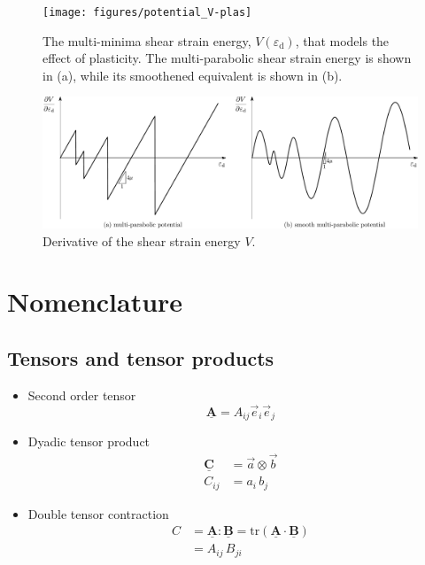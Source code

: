 \documentclass[times,namecite]{goose-article}
\newcommand\T[1]{\underline{\bm{{#1}}}}
\begin{document}
\begin{figure}[htp]
  \centering
  \texttt{[image: figures/potential\_V-plas]}
  \caption{The multi-minima shear strain energy, $V ( \varepsilon_\mathrm{d} )$, that models the effect of plasticity. The multi-parabolic shear strain energy is shown in (a), while its smoothened equivalent is shown in (b).}
  \label{fig:V:plas}
\end{figure}

\begin{figure}[htp]
  \centering
  \includegraphics[width=1.\textwidth]{figures/potential_dV-plas}
  \caption{Derivative of the shear strain energy $V$.}
  \label{fig:dV:plas}
\end{figure}

\section{Nomenclature}
\label{sec:nomenclature}

\subsection{Tensors and tensor products}
\label{sec:nomenclature:tensor}

\begin{itemize}
%
\item Second order tensor
\begin{equation}
  \T{A} = A_{ij} \vec{e}_i \vec{e}_j
\end{equation}
%
\item Dyadic tensor product
\begin{align}
  \T{C} &= \vec{a} \otimes \vec{b} \\
  C_{ij} &= a_{i} \, b_{j}
\end{align}
%
\item Double tensor contraction
\begin{align}
  C &= \T{A} : \T{B} = \text{tr} \left( \T{A} \cdot \T{B} \right) \\
    &= A_{ij} \, B_{ji}
\end{align}
%
\end{itemize}
\end{document}
